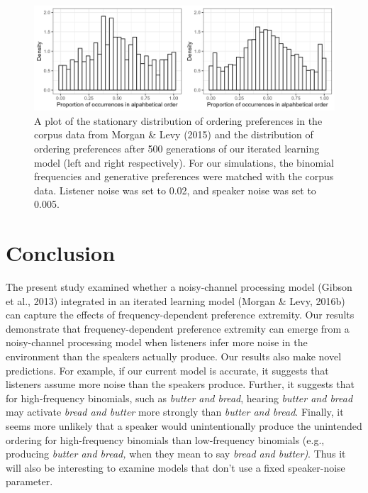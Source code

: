 \documentclass[10pt, letterpaper]{article}
\newenvironment{CodeChunk}{}{}
\begin{document}
\begin{CodeChunk}
\begin{figure}[!htb]

{\centering \includegraphics[width=1\linewidth]{Figures/corpus_plot_and_ours} 

}

\caption[A plot of the stationary distribution of ordering preferences in the corpus data from Morgan \& Levy (2015) and the distribution of ordering preferences after 500 generations of our iterated learning model (left and right respectively)]{A plot of the stationary distribution of ordering preferences in the corpus data from Morgan \& Levy (2015) and the distribution of ordering preferences after 500 generations of our iterated learning model (left and right respectively). For our simulations, the binomial frequencies and generative preferences were matched with the corpus data. Listener noise was set to 0.02, and speaker noise was set to 0.005.}\label{fig:corpusourmodel}
\end{figure}
\end{CodeChunk}

\hypertarget{conclusion}{%
\section{Conclusion}\label{conclusion}}

The present study examined whether a noisy-channel processing model
(Gibson et al., 2013) integrated in an iterated learning model (Morgan
\& Levy, 2016b) can capture the effects of frequency-dependent
preference extremity. Our results demonstrate that frequency-dependent
preference extremity can emerge from a noisy-channel processing model
when listeners infer more noise in the environment than the speakers
actually produce. Our results also make novel predictions. For example,
if our current model is accurate, it suggests that listeners assume more
noise than the speakers produce. Further, it suggests that for
high-frequency binomials, such as \emph{butter and bread}, hearing
\emph{butter and bread} may activate \emph{bread and butter} more
strongly than \emph{butter and bread}. Finally, it seems more unlikely
that a speaker would unintentionally produce the unintended ordering for
high-frequency binomials than low-frequency binomials (e.g., producing
\emph{butter and bread,} when they mean to say \emph{bread and butter)}.
Thus it will also be interesting to examine models that don't use a
fixed speaker-noise parameter.
\end{document}
